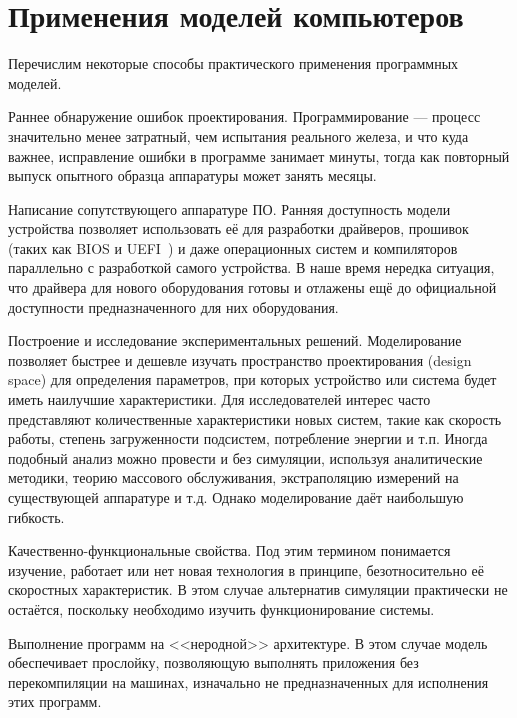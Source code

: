 \section{Применения моделей компьютеров}

Перечислим некоторые способы практического применения программных моделей.

\begin{description*}
    
\item[Раннее обнаружение ошибок проектирования.] Программирование --- процесс значительно менее затратный, чем испытания реального железа, и что куда важнее, исправление ошибки в программе занимает минуты, тогда как повторный выпуск опытного образца аппаратуры может занять месяцы. 

\item[Написание сопутствующего аппаратуре ПО.] Ранняя доступность модели устройства позволяет использовать её для разработки драйверов, прошивок (таких как BIOS и UEFI~\cite{uefi-itj}) и даже операционных систем и компиляторов параллельно с разработкой самого устройства. В наше время нередка ситуация, что драйвера для нового оборудования готовы и отлажены ещё до официальной доступности предназначенного для них оборудования.

\item[Построение и исследование экспериментальных решений.] Моделирование позволяет быстрее и дешевле  изучать пространство проектирования (\abbr design space) для определения параметров, при которых устройство или система будет иметь наилучшие характеристики. Для исследователей интерес часто представляют количественные характеристики новых систем, такие как скорость работы, степень загруженности подсистем, потребление энергии и т.п. Иногда подобный анализ можно провести и без симуляции, используя аналитические методики, теорию массового обслуживания, экстраполяцию измерений на существующей аппаратуре и т.д. Однако моделирование даёт наибольшую гибкость.

\item[Качественно-функциональные свойства.] Под этим тер\-ми\-ном понимается изучение, работает или нет новая технология в принципе, безотносительно её скоростных характеристик. В этом случае альтернатив симуляции практически не остаётся, поскольку необходимо изучить функционирование системы.

\item[Выполнение программ на <<неродной>> архитектуре.] В этом случае модель обеспечивает прослойку, позволяющую выполнять приложения без перекомпиляции на машинах, изначально не предназначенных для исполнения этих программ. 

\end{description*}

